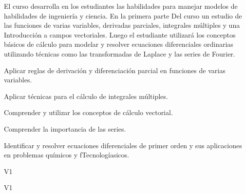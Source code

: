 \begin{syllabus}


\begin{justification}

El curso desarrolla en los estudiantes las habilidades para manejar modelos de habilidades de ingeniería y ciencia. En la primera parte
Del curso un estudio de las funciones de varias variables, derivadas parciales, integrales múltiples y una
Introducción a campos vectoriales. Luego el estudiante utilizará los conceptos básicos de cálculo para modelar y resolver ecuaciones diferenciales ordinarias utilizando técnicas como las transformadas de Laplace y las series de Fourier.

\end{justification}

\begin{goals}
  \item Aplicar reglas de derivación y diferenciación parcial en funciones de varias variables.
  \item Aplicar técnicas para el cálculo de integrales múltiples.
  \item Comprender y utilizar los conceptos de cálculo vectorial.
  \item Comprender la importancia de las series.
  \item Identificar y resolver ecuaciones diferenciales de primer orden y sus aplicaciones en problemas químicos y fTecnologíasicos.
\end{goals}

\begin{outcomes}{V1}
    \item {}  
    \item {}
\end{outcomes}

\begin{competences}{V1}
    \item {}
    \item {}
\end{competences}


\end{syllabus}
